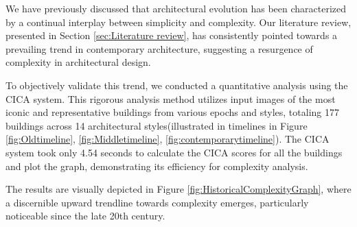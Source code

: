 %    


We have previously discussed that architectural evolution has been characterized by a continual interplay between simplicity and complexity.
Our literature review, presented in Section \ref{sec:Literature review}, has consistently pointed towards a prevailing trend in contemporary architecture, suggesting a resurgence of complexity in architectural design.

To objectively validate this trend, we conducted a quantitative analysis using the CICA system.
This rigorous analysis method utilizes input images of the most iconic and representative buildings from various epochs and styles, totaling 177 buildings across 14 architectural styles(illustrated in timelines in Figure \ref{fig:Oldtimeline}, \ref{fig:Middletimeline}, \ref{fig:contemporarytimeline}).
The CICA system took only 4.54 seconds to calculate the CICA scores for all the buildings and plot the graph, demonstrating its efficiency for complexity analysis.

The results are visually depicted in Figure \ref{fig:HistoricalComplexityGraph}, where a discernible upward trendline towards complexity emerges, particularly noticeable since the late 20th century.











